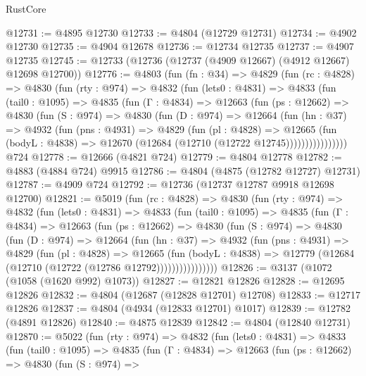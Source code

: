 \begin{lexlean}{RustCore}
\begin{coremodule}
@12731 := @4895 @12730
@12733 := @4804 (@12729 @12731)
@12734 := @4902 @12730
@12735 := @4904 @12678
@12736 := @12734 @12735
@12737 := @4907 @12735
@12745 := @12733 (@12736 (@12737 (@4909 @12667) (@4912 @12667) @12698 @12700))
@12776 := @4803
    (fun (fn : @34) =>
    @4829
      (fun (rc : @4828) =>
      @4830
        (fun (rty : @974) =>
        @4832
          (fun (lets0 : @4831) =>
          @4833
            (fun (tail0 : @1095) =>
            @4835
              (fun (Γ : @4834) =>
              @12663
                (fun (ps : @12662) =>
                @4830
                  (fun (S : @974) =>
                  @4830
                    (fun (D : @974) =>
                    @12664
                      (fun (hn : @37) =>
                      @4932
                        (fun (pns : @4931) =>
                        @4829
                          (fun (pl : @4828) =>
                          @12665
                            (fun (bodyL : @4838) =>
                            @12670 (@12684 (@12710 (@12722 @12745))))))))))))))))
    @724
@12778 := @12666 (@4821 @724)
@12779 := @4804 @12778
@12782 := @4883 (@4884 @724) @9915
@12786 := @4804 (@4875 (@12782 @12727) @12731)
@12787 := @4909 @724
@12792 := @12736 (@12737 @12787 @9918 @12698 @12700)
@12821 := @5019
    (fun (rc : @4828) =>
    @4830
      (fun (rty : @974) =>
      @4832
        (fun (lets0 : @4831) =>
        @4833
          (fun (tail0 : @1095) =>
          @4835
            (fun (Γ : @4834) =>
            @12663
              (fun (ps : @12662) =>
              @4830
                (fun (S : @974) =>
                @4830
                  (fun (D : @974) =>
                  @12664
                    (fun (hn : @37) =>
                    @4932
                      (fun (pns : @4931) =>
                      @4829
                        (fun (pl : @4828) =>
                        @12665
                          (fun (bodyL : @4838) =>
                          @12779 (@12684 (@12710 (@12722 (@12786 @12792))))))))))))))))
@12826 := @3137 (@1072 (@1058 (@1620 @992) @1073))
@12827 := @12821 @12826
@12828 := @12695 @12826
@12832 := @4804 (@12687 (@12828 @12701) @12708)
@12833 := @12717 @12826
@12837 := @4804 (@4934 (@12833 @12701) @1017)
@12839 := @12782 (@4891 @12826)
@12840 := @4875 @12839
@12842 := @4804 (@12840 @12731)
@12870 := @5022
    (fun (rty : @974) =>
    @4832
      (fun (lets0 : @4831) =>
      @4833
        (fun (tail0 : @1095) =>
        @4835
          (fun (Γ : @4834) =>
          @12663
            (fun (ps : @12662) =>
            @4830
              (fun (S : @974) =>

\end{coremodule}
\end{lexlean}

